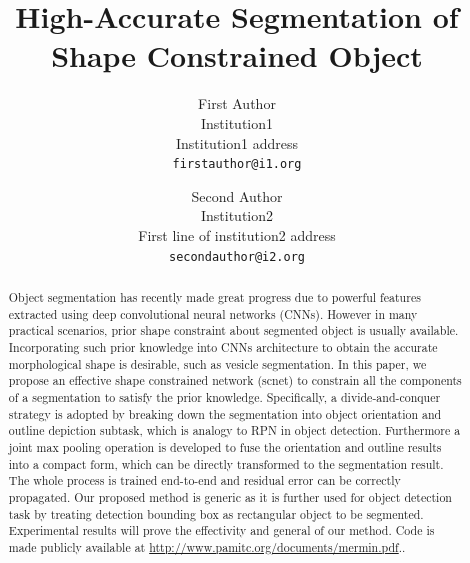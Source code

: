 \documentclass[10pt,twocolumn,letterpaper]{article}
\begin{document}
\title{High-Accurate Segmentation of Shape Constrained Object}

\author{First Author\\
Institution1\\
Institution1 address\\
{\tt\small firstauthor@i1.org}
\and
Second Author\\
Institution2\\
First line of institution2 address\\
{\tt\small secondauthor@i2.org}
}

\maketitle


\begin{abstract}
   Object segmentation has recently made great progress due to powerful features extracted using deep convolutional neural networks (CNNs).
   However in many practical scenarios, prior shape constraint about segmented object is usually available.
   Incorporating such prior knowledge into CNNs architecture to obtain the accurate morphological shape is desirable, such as vesicle segmentation.
   In this paper, we propose an effective shape constrained network (scnet) to constrain all the components of a segmentation to satisfy the prior knowledge.
   Specifically, a divide-and-conquer strategy is adopted by breaking down the segmentation into object orientation and outline depiction subtask, which is analogy to RPN in object detection.
   Furthermore a joint max pooling operation is developed to fuse the orientation and outline results into a compact form, which can be directly transformed to the segmentation result.
   The whole process is trained end-to-end and residual error can be correctly propagated.
   Our proposed method is generic as it is further used for object detection task by treating detection bounding box as rectangular object to be segmented.
   Experimental results will prove the effectivity and general of our method.
   Code is made publicly available at \url{http://www.pamitc.org/documents/mermin.pdf}..

\end{abstract}
\end{document}
